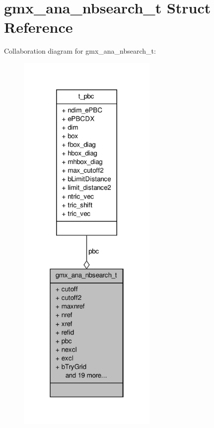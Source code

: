 \hypertarget{structgmx__ana__nbsearch__t}{\section{gmx\-\_\-ana\-\_\-nbsearch\-\_\-t \-Struct \-Reference}
\label{structgmx__ana__nbsearch__t}
}


\-Collaboration diagram for gmx\-\_\-ana\-\_\-nbsearch\-\_\-t\-:
\nopagebreak
\begin{figure}[H]
\begin{center}
\leavevmode
\includegraphics[width=190pt]{structgmx__ana__nbsearch__t__coll__graph}
\end{center}
\end{figure}
